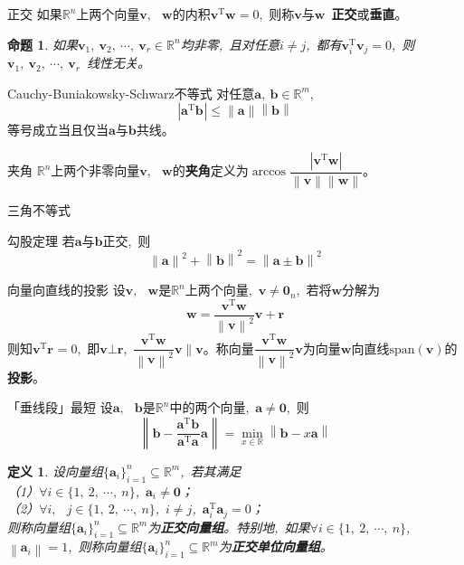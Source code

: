 \documentclass[10pt, a4paper, oneside, fontset=none]{ctexart}
\theoremstyle{plain}
\newtheorem{definition}{定义}[subsection]
\newtheorem{proposition}[theorem]{命题}
\theoremstyle{definition}
\newcommand{\com}{,\,\,\,\:}
\newcommand{\colors}[1]{\color{#1!75!black}}
\newcommand{\de}[2][]{\begin{defil}{#1}\kai #2\end{defil}}
\newcommand{\di}[2][]{\begin{theo}{#1}\run #2\end{theo}}
\newcommand{\R}{\mathbb{R}}
\newcommand{\tboba}[1]{\textbf{\kai\color{bali!75!black}#1}}
\newcommand{\neiji}[4]{\boldsymbol{#1}_{#3}^\mathrm{T}\boldsymbol{#2}_{#4}}
\begin{document}
\de[正交]{
    如果$\R^n$上两个向量$\boldsymbol{v}\com \boldsymbol{w}$的内积$\boldsymbol{v}^\mathrm{T}\boldsymbol{w}=0$\com 则称$\boldsymbol{v}$与$\boldsymbol{w}$~\tboba{正交}或\tboba{垂直}。
}
\begin{proposition}
    如果$\boldsymbol{v}_1,~\boldsymbol{v}_2,~\cdots,~\boldsymbol{v}_r\in \R^n$均非零\com 且对任意$i\neq j$\com 都有$\neiji{v}{v}{i}{j}=0$\com 则$\boldsymbol{v}_1,~\boldsymbol{v}_2,~\cdots,~\boldsymbol{v}_r$~线性无关。
\end{proposition}
\di[Cauchy-Buniakowsky-Schwarz不等式]{
    对任意$\boldsymbol{a},~\boldsymbol{b}\in \R^m$\com $$\left\lvert \neiji{a}{b}{}{}\right\rvert\le \left\lVert \boldsymbol{a}\right\rVert \left\lVert \boldsymbol{b}\right\rVert  $$等号成立当且仅当$\boldsymbol{a}$与$\boldsymbol{b}$共线。
}
\de[夹角]{
    $\R^n$上两个{\colors{bali}非零}向量$\boldsymbol{v}\com \boldsymbol{w}$的\tboba{夹角}定义为$\arccos\dfrac{\left\lvert \boldsymbol{v}^\mathrm{T}\boldsymbol{w}\right\rvert }{ \left\lVert \boldsymbol{v}\right\rVert \left\lVert \boldsymbol{w}\right\rVert}$。
}
\di[三角不等式]{
    \centering{$\left\lvert \left\lVert \boldsymbol{a}\right\rVert -\left\lVert \boldsymbol{b}\right\rVert \right\rvert  \le \left\lVert \boldsymbol{a}\pm \boldsymbol{b}\right\rVert  \le \left\lVert \boldsymbol{a}\right\rVert +\left\lVert \boldsymbol{b}\right\rVert $}
}
\di[勾股定理]{
    若$\boldsymbol{a}$与$\boldsymbol{b}$正交\com 则
    $$\left\lVert \boldsymbol{a}\right\rVert^2+\left\lVert \boldsymbol{b}\right\rVert^2=\left\lVert \boldsymbol{a}\pm \boldsymbol{b}\right\rVert^2   $$
}
\de[向量向直线的投影]{
    设$\boldsymbol{v}\com \boldsymbol{w}$是$\R^n$上两个向量\com $\boldsymbol{v}\neq \boldsymbol{0}_n$\com 若将$\boldsymbol{w}$分解为$$\boldsymbol{w}=\frac{\neiji{v}{w}{}{}}{\left\lVert \boldsymbol{v}\right\rVert^2 }\boldsymbol{v}+\boldsymbol{r}$$则知$\neiji{v}{r}{}{}=0$\com 即$\boldsymbol{v}\bot \boldsymbol{r}$\com $\dfrac{\neiji{v}{w}{}{}}{\left\lVert \boldsymbol{v}\right\rVert^2 }\boldsymbol{v} \parallel \boldsymbol{v}$。称向量$\dfrac{\neiji{v}{w}{}{}}{\left\lVert \boldsymbol{v}\right\rVert^2 }\boldsymbol{v}$为向量$\boldsymbol{w}$向直线$\mathrm{span} (\boldsymbol{v})$的\tboba{投影}。
}
\di[「垂线段」最短]{\label{线投影}
    设$\boldsymbol{a}\com \boldsymbol{b}$是$\R^n$中的两个向量\com $\boldsymbol{a}\neq \boldsymbol{0}$\com 则$$\left\lVert \boldsymbol{b}-\frac{\neiji{a}{b}{}{}}{\neiji{a}{a}{}{}}\boldsymbol{a}\right\rVert =\min_{x\in\R}\left\lVert \boldsymbol{b}-x\boldsymbol{a}\right\rVert $$
}
\begin{definition}
    设向量组$\{\boldsymbol{a}_i\}_{i=1}^n\subseteq\R^m$\com 若其满足\\
    （1）$\forall i \in \{1,~2,~\cdots,~n\}$\com $\boldsymbol{a}_i\neq \boldsymbol{0}$；\\
    （2）$\forall i\com j \in \{1,~2,~\cdots,~n\}$\com $i\neq j$\com $\neiji{a}{a}{i}{j}=0$；\\
    则称向量组$\{\boldsymbol{a}_i\}_{i=1}^n\subseteq\R^m$为\textbf{正交向量组}。特别地\com 如果$\forall i \in \{1,~2,~\cdots,~n\}$\com $\left\lVert \boldsymbol{a}_i\right\rVert =1 $\com 则称向量组$\{\boldsymbol{a}_i\}_{i=1}^n\subseteq\R^m$为\textbf{正交单位向量组}。
\end{definition}
\end{document}
